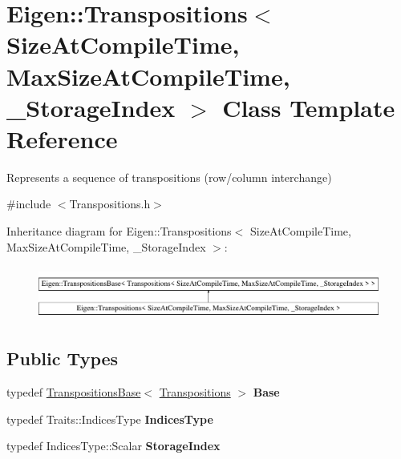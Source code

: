 \hypertarget{class_eigen_1_1_transpositions}{}\section{Eigen\+::Transpositions$<$ Size\+At\+Compile\+Time, Max\+Size\+At\+Compile\+Time, \+\_\+\+Storage\+Index $>$ Class Template Reference}
\label{class_eigen_1_1_transpositions}


Represents a sequence of transpositions (row/column interchange)  




{\ttfamily \#include $<$Transpositions.\+h$>$}

Inheritance diagram for Eigen\+::Transpositions$<$ Size\+At\+Compile\+Time, Max\+Size\+At\+Compile\+Time, \+\_\+\+Storage\+Index $>$\+:\begin{figure}[H]
\begin{center}
\leavevmode
\includegraphics[height=1.769352cm]{class_eigen_1_1_transpositions}
\end{center}
\end{figure}
\subsection*{Public Types}
\begin{DoxyCompactItemize}
\item 
\mbox{\label{class_eigen_1_1_transpositions_a0447f497ff56da1c7d491264bc2cef83}} 
typedef \mbox{\hyperlink{class_eigen_1_1_transpositions_base}{Transpositions\+Base}}$<$ \mbox{\hyperlink{class_eigen_1_1_transpositions}{Transpositions}} $>$ {\bfseries Base}
\item 
\mbox{\label{class_eigen_1_1_transpositions_aa62d34272509bd85ca30568b045376a5}} 
typedef Traits\+::\+Indices\+Type {\bfseries Indices\+Type}
\item 
\mbox{\label{class_eigen_1_1_transpositions_addc91a8189d9d78598a0c13e43f3c5db}} 
typedef Indices\+Type\+::\+Scalar {\bfseries Storage\+Index}
\end{DoxyCompactItemize}
